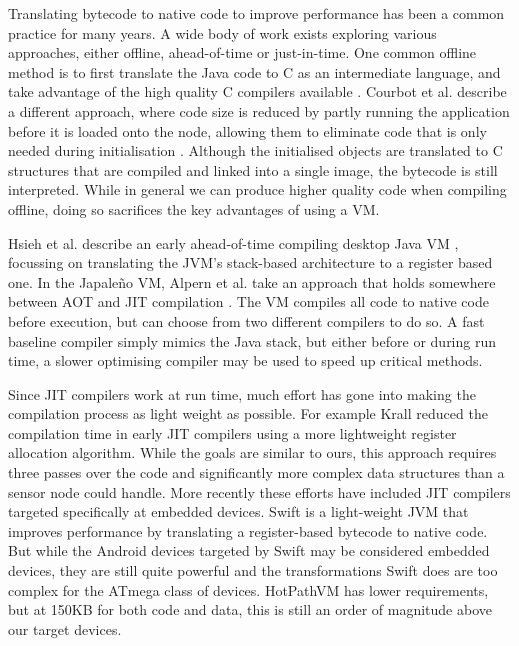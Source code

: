 Translating bytecode to native code to improve performance has been a common practice for many years. A wide body of work exists exploring various approaches, either offline, ahead-of-time  or just-in-time. One common offline method is to first translate the Java code to C as an intermediate language, and take advantage of the high quality C compilers available \cite{Dean:1996wb, Muller:1997}. Courbot et al. describe a different approach, where code size is reduced by partly running the application before it is loaded onto the node, allowing them to eliminate code that is only needed during initialisation \cite{Courbot:2010}. Although the initialised objects are translated to C structures that are compiled and linked into a single image, the bytecode is still interpreted. While in general we can produce higher quality code when compiling offline, doing so sacrifices the key advantages of using a VM.

Hsieh et al. describe an early ahead-of-time compiling desktop Java VM \cite{Hsieh:1996cy}, focussing on translating the JVM's stack-based architecture to a register based one. In the Japale\~no VM, Alpern et al. take an approach that holds somewhere between AOT and JIT compilation \cite{Alpern:1999}. The VM compiles all code to native code before execution, but can choose from two different compilers to do so. A fast baseline compiler simply mimics the Java stack, but either before or during run time, a slower optimising compiler may be used to speed up critical methods.

Since JIT compilers work at run time, much effort has gone into making the compilation process as light weight as possible. For example Krall \cite{Krall:1998} reduced the compilation time in early JIT compilers using a more lightweight register allocation algorithm. While the goals are similar to ours, this approach requires three passes over the code and significantly more complex data structures than a sensor node could handle. More recently these efforts have included JIT compilers targeted specifically at embedded devices. Swift \cite{Zhang:2012wf} is a light-weight JVM that improves performance by translating a register-based bytecode to native code. But while the Android devices targeted by Swift may be considered embedded devices, they are still quite powerful and the transformations Swift does are too complex for the ATmega class of devices. HotPathVM \cite{Gal:2006} has lower requirements, but at 150KB for both code and data, this is still an order of magnitude above our target devices.


